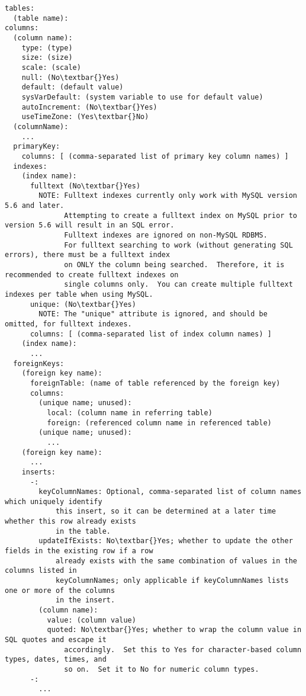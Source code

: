 \documentclass[letterpaper,10pt,english]{sphinxmanual}
\begin{document}
\begin{Verbatim}[commandchars=\\\{\}]
tables:
  (table name):
columns:
  (column name):
    type: (type)
    size: (size)
    scale: (scale)
    null: (No\textbar{}Yes)
    default: (default value)
    sysVarDefault: (system variable to use for default value)
    autoIncrement: (No\textbar{}Yes)
    useTimeZone: (Yes\textbar{}No)
  (columnName):
    ...
  primaryKey:
    columns: [ (comma-separated list of primary key column names) ]
  indexes:
    (index name):
      fulltext (No\textbar{}Yes)
        NOTE: Fulltext indexes currently only work with MySQL version 5.6 and later.
              Attempting to create a fulltext index on MySQL prior to version 5.6 will result in an SQL error.
              Fulltext indexes are ignored on non-MySQL RDBMS.
              For fulltext searching to work (without generating SQL errors), there must be a fulltext index
              on ONLY the column being searched.  Therefore, it is recommended to create fulltext indexes on
              single columns only.  You can create multiple fulltext indexes per table when using MySQL.
      unique: (No\textbar{}Yes)
        NOTE: The "unique" attribute is ignored, and should be omitted, for fulltext indexes.
      columns: [ (comma-separated list of index column names) ]
    (index name):
      ...
  foreignKeys:
    (foreign key name):
      foreignTable: (name of table referenced by the foreign key)
      columns:
        (unique name; unused):
          local: (column name in referring table)
          foreign: (referenced column name in referenced table)
        (unique name; unused):
          ...
    (foreign key name):
      ...
    inserts:
      -:
        keyColumnNames: Optional, comma-separated list of column names which uniquely identify
            this insert, so it can be determined at a later time whether this row already exists
            in the table.
        updateIfExists: No\textbar{}Yes; whether to update the other fields in the existing row if a row
            already exists with the same combination of values in the columns listed in
            keyColumnNames; only applicable if keyColumnNames lists one or more of the columns
            in the insert.
        (column name):
          value: (column value)
          quoted: No\textbar{}Yes; whether to wrap the column value in SQL quotes and escape it
              accordingly.  Set this to Yes for character-based column types, dates, times, and
              so on.  Set it to No for numeric column types.
      -:
        ...
\end{Verbatim}
\end{document}
